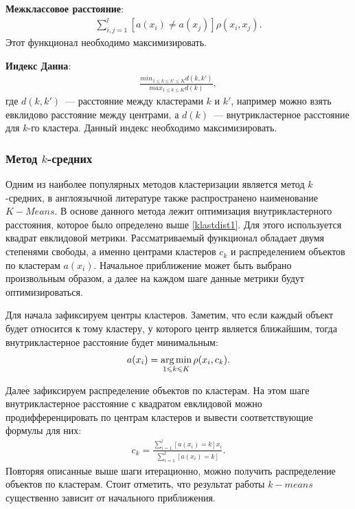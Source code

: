 \documentclass[12pt,a4paper]{article} %
\begin{document}
\textbf{Межклассовое расстояние}:
\begin{gather}\label{klastdist2}
\sum\limits_{i,j = 1}^{l}[a(x_i)\not=a(x_j)]\rho(x_i, x_j).
\end{gather}
Этот функционал необходимо максимизировать.

\textbf{Индекс Данна}:
\begin{gather}\label{klastdist3}
	\frac{min_{1\leq k\leq k'\leq K}d(k,k')}{max_{1\leq k\leq K}d(k)}, 
\end{gather}
где $d(k,k')$~--- расстояние между кластерами $k$ и $k'$, например можно взять евклидово расстояние между центрами, а $d(k)$~--- внутрикластерное расстояние для $k$-го кластера. Данный индекс необходимо максимизировать.

\subsubsection{Метод $k$-средних}

Одним из наиболее популярных методов кластеризации является метод $k$-средних, в англоязычной литературе также распространено наименование  $K-Means$. В основе данного метода лежит оптимизация внутрикластерного расстояния, которое было определено выше \ref{klastdist1}. Для этого используется квадрат евклидовой метрики. Рассматриваемый функционал обладает двумя степенями свободы, а именно центрами кластеров $c_k$ и распределением объектов по кластерам $a(x_i)$. Начальное приближение может быть выбрано произвольным образом, а далее на каждом шаге данные метрики будут оптимизироваться.

Для начала зафиксируем центры кластеров. Заметим, что если каждый объект будет относится к тому кластеру, у которого центр является ближайшим, тогда внутрикластерное расстояние будет минимальным:
\begin{gather}\label{klastdist4}
	a(x_i) = \mathop{\rm arg\,min}\limits_{1\leqslant k\leqslant K} \rho(x_i, c_k).
\end{gather}

Далее зафиксируем распределение объектов по кластерам. На этом шаге внутрикластерное расстояние с квадратом евклидовой можно продифференцировать по центрам кластеров и вывести соответствующие формулы для них:
\begin{gather}\label{klastdist5}
c_k = \frac{\sum\limits_{i=1}^{l}[a(x_i)= k]x_i}{\sum\limits_{i=1}^{l}[a(x_i)= k]}.
\end{gather}
Повторяя описанные выше шаги итерационно, можно получить распределение объектов по кластерам. Стоит отметить, что результат работы $k-means$ существенно зависит от начального приближения.
\end{document}
